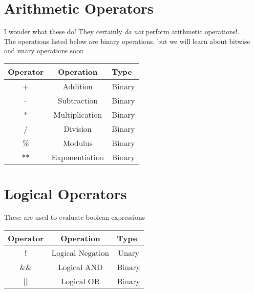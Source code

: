 \section{Arithmetic Operators}
I wonder what these do! They certainly \emph{do not} perform arithmetic operations!. The operations listed below are binary operations, but we will learn about bitwise and unary operations soon
\begin{table}[h] \centering
	\begin{tabular}{ccc}
		\cellcolor[HTML]{FFFFFF}Operator & \cellcolor[HTML]{FFFFFF}Operation & \multicolumn{1}{l}{Type} \\ \hline
		+                                & Addition                          & Binary                   \\
		-                                & Subtraction                       & Binary                   \\
		*                                & Multiplication                    & Binary                   \\
		/                                & Division                          & Binary                   \\
		\%                               & Modulus                           & Binary                   \\
		**                               & Exponentiation                    & Binary                  
	\end{tabular}
\end{table}

\section{Logical Operators}
These are used to evaluate boolean expressions
\begin{table}[h] \centering
	\begin{tabular}{ccc}
		\cellcolor[HTML]{FFFFFF}Operator & \cellcolor[HTML]{FFFFFF}Operation & \multicolumn{1}{l}{Type} \\ \hline
		!                                & Logical Negation                  & Unary                    \\
		\&\&                             & Logical AND                       & Binary                   \\
		||                               & Logical OR                   	 & Binary                   
	\end{tabular}
\end{table}

